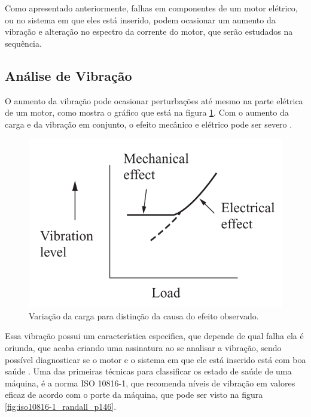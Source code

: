 Como apresentado anteriormente, falhas em componentes de um motor elétrico, ou no sistema em que eles está inserido, podem ocasionar
um aumento da vibração e alteração no espectro da corrente do motor, que serão estudados na sequência.


% 

\subsection{Análise de Vibração}\label{subsec:}

O aumento da vibração pode ocasionar perturbações até mesmo na parte elétrica de um motor, como mostra o gráfico que está na 
figura \ref{fig:fault_effect_randall_p54}. Com o aumento da carga e da vibração em conjunto, o efeito mecânico e elétrico pode ser 
severo .

\begin{figure}[H]
    \caption{Variação da carga para distinção da causa do efeito observado.}
    \begin{center}
        \includegraphics[scale=.45]{referencial/img/fault_effect_randall_p54.png}
    \end{center}
    \label{fig:fault_effect_randall_p54}
\end{figure}


Essa vibração possui um característica especifica, que depende de qual falha ela é oriunda, que acaba criando uma assinatura
ao se analisar a vibração, sendo possível diagnosticar se o motor e o sistema em que ele está inserido está com boa saúde \cite{Wu2013}.
Uma das primeiras técnicas para classificar os estado de saúde de uma máquina, é a norma ISO 10816-1, que recomenda níveis de vibração 
em valores eficaz de acordo com o porte da máquina, que pode ser visto na figura \ref{fig:iso10816-1_randall_p146}.

